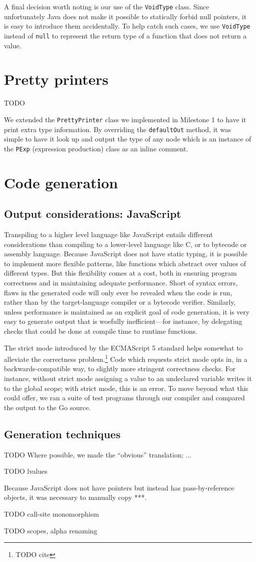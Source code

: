 \documentclass[oneside]{article}
\begin{document}
A final decision worth noting is our use of the \texttt{VoidType} class. Since unfortunately Java does not make it possible to statically forbid null pointers, it is easy to introduce them accidentally. To help catch such cases, we use \texttt{VoidType} instead of \texttt{null} to represent the return type of a function that does not return a value.

\section{Pretty printers}

TODO

We extended the \verb|PrettyPrinter| class we implemented in Milestone 1 to have it print extra type information. By overriding the \verb|defaultOut| method, it was simple to have it look up and output the type of any node which is an instance of the \verb|PExp| (expression production) class as an inline comment.

\section{Code generation}
\subsection{Output considerations: JavaScript}
Transpiling to a higher level language like JavaScript entails different considerations than compiling to a lower-level language like C, or to bytecode or assembly language. Because JavaScript does not have static typing, it is possible to implement more flexible patterns, like functions which abstract over values of different types. But this flexibility comes at a cost, both in ensuring program correctness and in maintaining adequate performance. Short of syntax errors, flaws in the generated code will only ever be revealed when the code is run, rather than by the target-language compiler or a bytecode verifier. Similarly, unless performance is maintained as an explicit goal of code generation, it is very easy to generate output that is woefully inefficient---for instance, by delegating checks that could be done at compile time to runtime functions.

The strict mode introduced by the ECMAScript 5 standard helps somewhat to alleviate the correctness problem.\footnote{TODO cite} Code which requests strict mode opts in, in a backwards-compatible way, to slightly more stringent correctness checks. For instance, without strict mode assigning a value to an undeclared variable writes it to the global scope; with strict mode, this is an error. To move beyond what this could offer, we ran a suite of test programs through our compiler and compared the output to the Go source.

\subsection{Generation techniques}
TODO Where possible, we made the ``obvious'' translation; ...

TODO lvalues

Because JavaScript does not have pointers but instead has pass-by-reference objects, it was necessary to manually copy ***.

TODO call-site monomorphism

TODO scopes, alpha renaming
\end{document}
